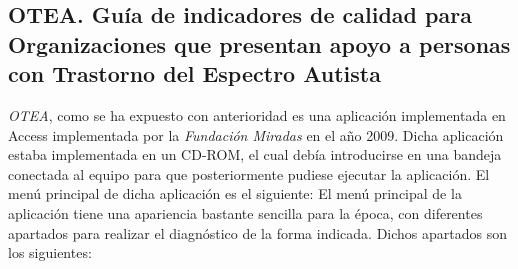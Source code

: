     \subsection{OTEA. Guía de indicadores de calidad para Organizaciones que presentan apoyo a personas con Trastorno del Espectro Autista}
    \textit{OTEA}, como se ha expuesto con anterioridad es una aplicación implementada en Access implementada por la \textit{Fundación Miradas} en el año 2009.
    Dicha aplicación estaba implementada en un CD-ROM, el cual debía introducirse en una bandeja conectada al equipo para que posteriormente pudiese ejecutar la aplicación.
    El menú principal de dicha aplicación es el siguiente:
    El menú principal de la aplicación tiene una apariencia bastante sencilla para la época, con diferentes apartados para realizar el diagnóstico de la forma indicada. Dichos apartados son los siguientes:
